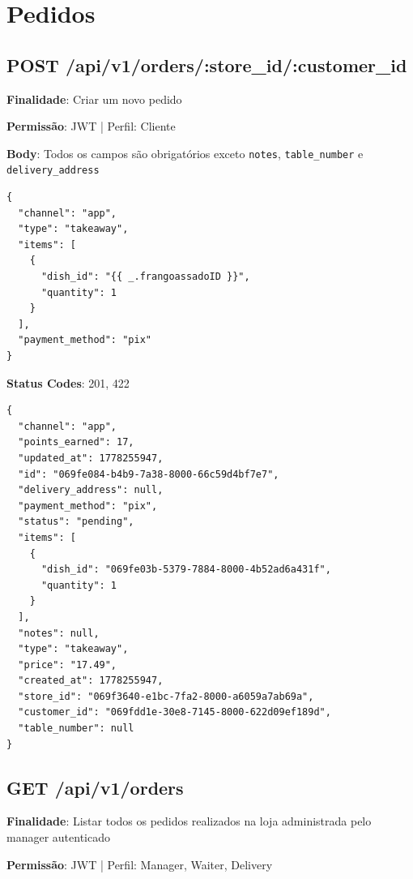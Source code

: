 \section{Pedidos}

\subsection{POST /api/v1/orders/:store\_id/:customer\_id}

\noindent\textbf{Finalidade}: Criar um novo pedido

\noindent\textbf{Permissão}: JWT | Perfil: Cliente

\noindent\textbf{Body}: Todos os campos são obrigatórios exceto \texttt{notes}, \texttt{table\_number} e \texttt{delivery\_address}

\vspace{-0.2cm}

\begin{verbatim}
{
  "channel": "app",
  "type": "takeaway",
  "items": [
    {
      "dish_id": "{{ _.frangoassadoID }}",
      "quantity": 1
    }
  ],
  "payment_method": "pix"
}
\end{verbatim}

\noindent\textbf{Status Codes}: 201, 422

\begin{tcolorbox}[colback=green!5, colframe=black, title=\textbf{201 Created}]
\begin{verbatim}
{
  "channel": "app",
  "points_earned": 17,
  "updated_at": 1778255947,
  "id": "069fe084-b4b9-7a38-8000-66c59d4bf7e7",
  "delivery_address": null,
  "payment_method": "pix",
  "status": "pending",
  "items": [
    {
      "dish_id": "069fe03b-5379-7884-8000-4b52ad6a431f",
      "quantity": 1
    }
  ],
  "notes": null,
  "type": "takeaway",
  "price": "17.49",
  "created_at": 1778255947,
  "store_id": "069f3640-e1bc-7fa2-8000-a6059a7ab69a",
  "customer_id": "069fdd1e-30e8-7145-8000-622d09ef189d",
  "table_number": null
}
\end{verbatim}
\end{tcolorbox}

\subsection{GET /api/v1/orders}

\noindent\textbf{Finalidade}: Listar todos os pedidos realizados na loja administrada pelo manager autenticado

\noindent\textbf{Permissão}: JWT | Perfil: Manager, Waiter, Delivery

